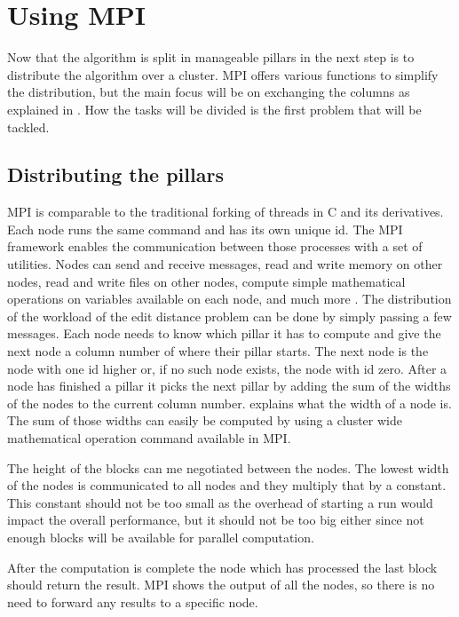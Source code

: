 \section{Using MPI}
Now that the algorithm is split in manageable pillars in  the next step is to distribute the algorithm over a cluster.
MPI offers various functions to simplify the distribution, but the main focus will be on exchanging the columns as explained in .
How the tasks will be divided is the first problem that will be tackled.

\subsection{Distributing the pillars}
MPI is comparable to the traditional forking of threads in C and its derivatives.
Each node runs the same command and has its own unique id.
The MPI framework enables the communication between those processes with a set of utilities.
Nodes can send and receive messages, read and write memory on other nodes, read and write files on other nodes, compute simple mathematical operations on variables available on each node, and much more \cite{MPI}.
The distribution of the workload of the edit distance problem can be done by simply passing a few messages.
Each node needs to know which pillar it has to compute and give the next node a column number of where their pillar starts.
The next node is the node with one id higher or, if no such node exists, the node with id zero.
After a node has finished a pillar it picks the next pillar by adding the sum of the widths of the nodes to the current column number.
 explains what the width of a node is.
The sum of those widths can easily be computed by using a cluster wide mathematical operation command available in MPI.

The height of the blocks can me negotiated between the nodes.
The lowest width of the nodes is communicated to all nodes and they multiply that by a constant.
This constant should not be too small as the overhead of starting a run would impact the overall performance, but it should not be too big either since not enough blocks will be available for parallel computation.

After the computation is complete the node which has processed the last block should return the result.
MPI shows the output of all the nodes, so there is no need to forward any results to a specific node.

